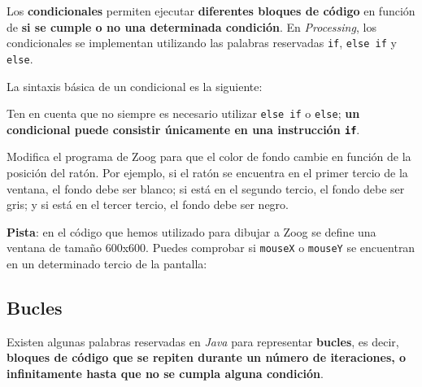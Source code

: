 \documentclass[
  spanish,
  11pt,
  a4paper,
  DIV=11,
  numbers=noendperiod]{scrartcl}
\begin{document}
\label{condicionales}

Los \textbf{condicionales} permiten ejecutar \textbf{diferentes bloques de código} en función de \textbf{si se cumple o no una determinada condición}. En \emph{Processing}, los condicionales se implementan utilizando las palabras reservadas \texttt{if}, \texttt{else\ if} y \texttt{else}.

La sintaxis básica de un condicional es la siguiente:


Ten en cuenta que no siempre es necesario utilizar \texttt{else\ if} o \texttt{else}; \textbf{un condicional puede consistir únicamente en una instrucción \texttt{if}}.

\begin{tcolorbox}[enhanced jigsaw, toprule=.15mm, coltitle=black, titlerule=0mm, opacitybacktitle=0.6, breakable, colback=white, colframe=quarto-callout-note-color-frame, colbacktitle=quarto-callout-note-color!10!white, opacityback=0, title={Ejercicio 15 - Color de fondo interactivo}, bottomtitle=1mm, rightrule=.15mm, toptitle=1mm, left=2mm, bottomrule=.15mm, leftrule=.75mm, arc=.35mm]

Modifica el programa de Zoog para que el color de fondo cambie en función de la posición del ratón. Por ejemplo, si el ratón se encuentra en el primer tercio de la ventana, el fondo debe ser blanco; si está en el segundo tercio, el fondo debe ser gris; y si está en el tercer tercio, el fondo debe ser negro.

\textbf{Pista}: en el código que hemos utilizado para dibujar a Zoog se define una ventana de tamaño 600x600. Puedes comprobar si \texttt{mouseX} o \texttt{mouseY} se encuentran en un determinado tercio de la pantalla:


\end{tcolorbox}

\subsection{Bucles}

\label{bucles}

Existen algunas palabras reservadas en \emph{Java} para representar \textbf{bucles}, es decir, \textbf{bloques de código que se repiten durante un número de iteraciones, o infinitamente hasta que no se cumpla alguna condición}.
\end{document}

